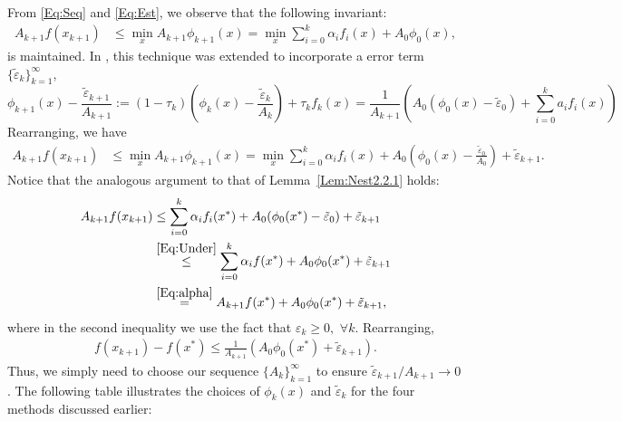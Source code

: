 \documentclass[11pt]{article}
\theoremstyle{plain}
\begin{document}
\noindent From \eqref{Eq:Seq} and \eqref{Eq:Est}, we observe that the following  invariant:
\begin{align}\label{Eq:EstSeqInv}
A_{k+1} f(x_{k+1}) &\leq \min_x A_{k+1} \phi_{k+1}(x) = \min_x  \sum_{i=0}^k \alpha_i f_i(x) +  A_0\phi_0(x),
\end{align}
is maintained. In \cite{Nesterov15, NesterovCond15}, this technique was extended to incorporate a error term $\{\tilde \varepsilon_k\}_{k=1}^\infty$,
\begin{equation}\label{Eq:Est2}
\phi_{k+1}(x) - \frac{\tilde \varepsilon_{k+1}}{A_{k+1}} := (1 - \tau_k) \left(\phi_k(x) - \frac{\tilde \varepsilon_{k}}{A_k}\right) + \tau_k f_k(x) = \frac{1}{A_{k+1}} \left(A_0(\phi_0(x) - \tilde \varepsilon_0) + \sum_{i=0}^k a_i f_i(x)\right) 
\end{equation}
Rearranging, we have
\begin{align}\label{Eq:EstSeqInv2}
A_{k+1} f(x_{k+1}) &\leq \min_x A_{k+1}\phi_{k+1}(x) = \min_x  \sum_{i=0}^k \alpha_i f_i(x) +  A_0\left(\phi_0(x) - \frac{\tilde \varepsilon_0}{A_0}\right) + \tilde \varepsilon_{k+1}.
\end{align}
Notice that the analogous argument to that of Lemma~\ref{Lem:Nest2.2.1} holds:
\begin{subequations}\label{Eq:EstSeqErr}
\begin{align}
A_{k+1} f(x_{k+1}) &\leq \sum_{i=0}^k \alpha_i f_i(x^\ast) + A_0 (\phi_0(x^\ast) - \tilde \varepsilon_0)  + \tilde \varepsilon_{k+1}\notag\\
&\overset{\eqref{Eq:Under}}{\leq} \sum_{i=0}^k \alpha_i f(x^\ast) +  A_0\phi_0(x^\ast)  + \tilde \varepsilon_{k+1}\notag\\
& \overset{\eqref{Eq:alpha}}{=} A_{k+1} f(x^\ast) +  A_0\phi_0(x^\ast) + \tilde \varepsilon_{k+1},
\end{align}
\end{subequations}
where in the second inequality we use the fact that $\varepsilon_k \geq 0,\,\, \forall k$. Rearranging,
\begin{align*}
f(x_{k+1}) - f(x^\ast) \leq \frac{1}{A_{k+1}}\left(A_0\phi_0(x^\ast)  + \tilde \varepsilon_{k+1}\right).
\end{align*}
Thus, we simply need to choose our sequence $\{A_k\}_{k=1}^\infty$ to ensure $\tilde \varepsilon_{k+1}/ A_{k+1} \rightarrow 0$. The following table illustrates the choices of $\phi_k(x)$ and $\tilde \varepsilon_k$ for the four methods discussed earlier: 
\end{document}
